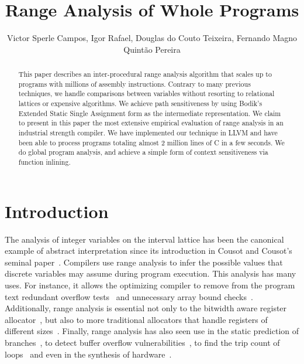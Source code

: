 \documentclass{llncs}
\begin{document}
\title {Range Analysis of Whole Programs}

\author{Victor Sperle Campos, Igor Rafael, Douglas do Couto Teixeira,
Fernando Magno Quint\~{a}o Pereira}



\maketitle

\begin{abstract}
This paper describes an inter-procedural range analysis algorithm that scales
up to programs with millions of assembly instructions.
Contrary to many previous techniques, we handle comparisons between variables
without resorting to relational lattices or expensive algorithms.
We achieve path sensitiveness by using Bodik's Extended Static Single
Assignment form as the intermediate representation.
We claim to present in this paper the most extensive empirical evaluation of
range analysis in an industrial strength compiler.
We have implemented our technique in LLVM and have been able to process
programs totaling almost 2 million lines of C in a few seconds.
We do global program analysis, and achieve a simple form of context
sensitiveness via function inlining.
\end{abstract}

\section{Introduction}
\label{sec:intro}

The analysis of integer variables on the interval lattice has been the
canonical example of abstract interpretation since its introduction in
Cousot and Cousot's seminal paper~\cite{Cousot77}.
Compilers use range analysis to infer the possible values that discrete
variables may assume during program execution.
This analysis has many uses.
For instance, it allows the optimizing compiler to remove from the program text
redundant overflow tests~\cite{Sol11} and unnecessary array bound
checks~\cite{Bodik00}.
Additionally, range analysis is essential not only to the bitwidth aware
register allocator~\cite{Barik06,Tallam03}, but also to more traditional
allocators that handle registers of different
sizes~\cite{Kong98,Pereira08,Scholz02}.
Finally, range analysis has also seen use in the static prediction of
branches~\cite{Patterson95}, to detect buffer overflow
vulnerabilities~\cite{Simon08,Wagner00}, to find the trip count of
loops~\cite{Lokuciejewski09}
and even in the synthesis of hardware~\cite{Cong05,Mahlke01}.
\end{document}
